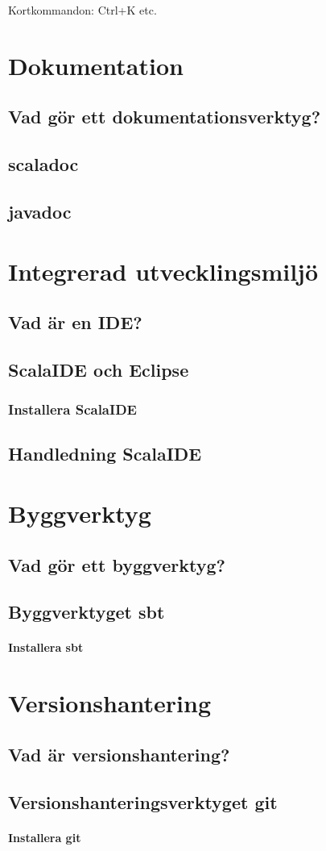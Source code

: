 \documentclass[a4paper]{compendium}
\begin{document}
Kortkommandon: Ctrl+K etc.

\chapter{Dokumentation}
\section{Vad gör ett dokumentationsverktyg?}
\section{scaladoc}
\section{javadoc}

\chapter{Integrerad utvecklingsmiljö}
\section{Vad är en IDE?}
\section{ScalaIDE och Eclipse}
\subsection{Installera ScalaIDE}
\section{Handledning ScalaIDE}

\chapter{Byggverktyg}
\section{Vad gör ett byggverktyg?}
\section{Byggverktyget sbt}
\subsubsection{Installera sbt}

\chapter{Versionshantering}
\section{Vad är versionshantering?}
\section{Versionshanteringsverktyget git}
\subsubsection{Installera git}
\end{document}
